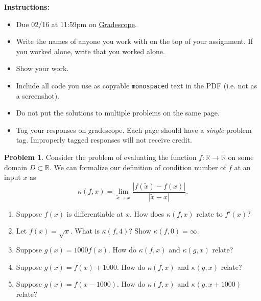 \documentclass[12pt]{article}
\theoremstyle{definition}
\newtheorem{problem}{Problem}
\begin{document}
    \textbf{\Large{}}
    
    \vspace{-1.8em}
    \hrulefill
 
\textbf{Instructions:}
    \begin{itemize}
        \item Due 02/16 at 11:59pm on \href{https://www.gradescope.com/courses/487363/}{Gradescope}.
        \item Write the names of anyone you work with on the top of your assignment. If you worked alone, write that you worked alone.
        \item Show your work.
        \item Include all code you use as copyable \verb|monospaced| text in the PDF (i.e. not as a screenshot).
        \item Do not put the solutions to multiple problems on the same page.
        \item Tag your responses on gradescope. Each page should have a \emph{single} problem tag. Improperly tagged responses will not receive credit.
\end{itemize}
    
\vspace{2em}

\begin{problem}
    Consider the problem of evaluating the function $f:\mathbb{R}\to\mathbb{R}$ on some domain $D \subset \mathbb{R}$.
    We can formalize our definition of condition number of $f$ at an input $x$ as
    \begin{equation*}
        \kappa(f,x) = \lim_{\tilde{x} \to x} \frac{|f(\tilde{x}) - f(x)|}{|\tilde{x}-x|}.
    \end{equation*}

    \begin{enumerate}
        \item Suppose $f(x)$ is differentiable at $x$. 
            How does $\kappa(f,x)$ relate to $f'(x)$?
        \item Let $f(x) = \sqrt{x}$.
            What is $\kappa(f,4)$? Show $\kappa(f,0) = \infty$.
        \item Suppose $g(x) = 1000 f(x)$. How do $\kappa(f,x)$ and $\kappa(g,x)$ relate?
        \item Suppose $g(x) = f(x)+1000$. How do $\kappa(f,x)$ and $\kappa(g,x)$ relate?
        \item Suppose $g(x) = f(x-1000)$. How do $\kappa(f,x)$ and $\kappa(g,x+1000)$ relate?
    \end{enumerate}
\end{problem}
\end{document}
